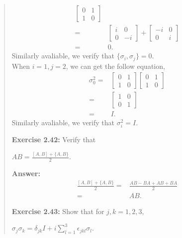 \documentclass[UTF8]{ctexart}
\begin{document}
\begin{quote}
\begin{equation}
\begin{aligned}
\begin{bmatrix}
					0 & 1 \\
					1 & 0	
					\end{bmatrix}
					\\
					=&\begin{bmatrix}
						i & 0 \\
						0 & -i	
						\end{bmatrix}
						+
						\begin{bmatrix}
							-i & 0 \\
							0 & i	
							\end{bmatrix}
							\\
					=&0.
	\end{aligned}
	\end{equation}
	Similarly avaliable, we verify that $\{\sigma_{i},\sigma_{j}\} = 0$.
\\
When $i=1, j=2$, we can get the follow equation,
\begin{equation}
	\begin{aligned}
		\sigma_{0}^{2}=&
			\begin{bmatrix}
				0 & 1 \\
				1 & 0	
				\end{bmatrix}
				\begin{bmatrix}
					0 & 1 \\
					1 & 0	
					\end{bmatrix}
					\\
					=&\begin{bmatrix}
						1 & 0 \\
						0 & 1	
						\end{bmatrix}
					\\
					=&I.
	\end{aligned}
	\end{equation}
	Similarly avaliable, we verify that $\sigma_{i}^{2} = I$.

\textbf{Exercise 2.42:  } Verify that
\begin{center}
	$AB=\frac{[A,B] + \{A,B\} }{2}$.
\end{center}
\textbf{Answer:}\\
\begin{equation}
	\begin{aligned}
\frac{[A,B] + \{A,B\} }{2}=&\frac{AB-BA + AB+BA }{2}\\
						  =&AB.
	\end{aligned}
	\end{equation}


\textbf{Exercise 2.43:} Show that for $j,k = 1,2,3,$
\begin{center}
$\sigma_{j}\sigma_{k}=\delta_{jk}I+i\sum_{l=1}^{3}\epsilon_{jkl}\sigma_{l}.$
\end{center}


\end{quote}
\end{document}
